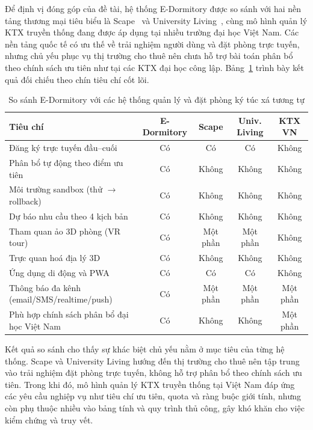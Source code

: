 \documentclass[../DoAn.tex]{subfiles}
\begin{document}
Để định vị đóng góp của đề tài, hệ thống E-Dormitory được so sánh với hai nền tảng thương mại tiêu biểu là Scape~\cite{scape_housing} và University Living~\cite{university_living}, cùng mô hình quản lý KTX truyền thống đang được áp dụng tại nhiều trường đại học Việt Nam. Các nền tảng quốc tế có ưu thế về trải nghiệm người dùng và đặt phòng trực tuyến, nhưng chủ yếu phục vụ thị trường cho thuê nên chưa hỗ trợ bài toán phân bổ theo chính sách ưu tiên như tại các KTX đại học công lập. Bảng~\ref{tab:sosanh} trình bày kết quả đối chiếu theo chín tiêu chí cốt lõi.


\begin{table}[H]
\centering
\caption{So sánh E-Dormitory với các hệ thống quản lý và đặt phòng ký túc xá tương tự}
\label{tab:sosanh}
\small
\begin{tabular}{|p{5.4cm}|c|c|c|c|}
\hline
\textbf{Tiêu chí} & \textbf{E-Dormitory} & \textbf{Scape} & \textbf{Univ. Living} & \textbf{KTX VN} \\
\hline
Đăng ký trực tuyến đầu--cuối                & Có       & Có       & Có       & Không    \\
\hline
Phân bổ tự động theo điểm ưu tiên           & Có       & Không    & Không    & Không    \\
\hline
Môi trường sandbox (thử $\to$ rollback)     & Có       & Không    & Không    & Không    \\
\hline
Dự báo nhu cầu theo 4 kịch bản              & Có       & Không    & Không    & Không    \\
\hline
Tham quan ảo 3D phòng (VR tour)             & Có       & Một phần & Một phần & Không    \\
\hline
Trực quan hoá địa lý 3D                     & Có       & Không    & Không    & Không    \\
\hline
Ứng dụng di động và PWA                     & Có       & Có       & Có       & Không    \\
\hline
Thông báo đa kênh (email/SMS/realtime/push) & Có       & Một phần & Một phần & Một phần \\
\hline
Phù hợp chính sách phân bổ đại học Việt Nam & Có      & Không    & Không    & Một phần \\
\hline
\end{tabular}
\end{table}

Kết quả so sánh cho thấy sự khác biệt chủ yếu nằm ở mục tiêu của từng hệ thống. Scape và University Living hướng đến thị trường cho thuê nên tập trung vào trải nghiệm đặt phòng trực tuyến, không hỗ trợ phân bổ theo chính sách ưu tiên. Trong khi đó, mô hình quản lý KTX truyền thống tại Việt Nam đáp ứng các yêu cầu nghiệp vụ như tiêu chí ưu tiên, quota và ràng buộc giới tính, nhưng còn phụ thuộc nhiều vào bảng tính và quy trình thủ công, gây khó khăn cho việc kiểm chứng và truy vết.
\end{document}
